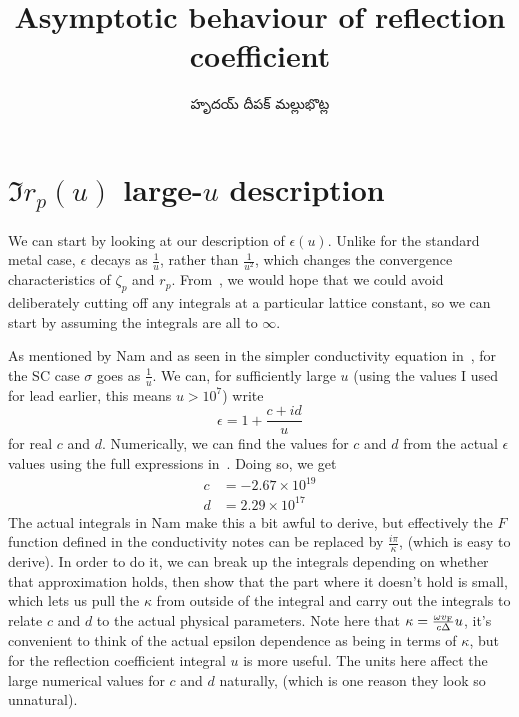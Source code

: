 \documentclass[../main.tex]{subfiles}
\title{Asymptotic behaviour of reflection coefficient}
\author{\begin{telugu}హృదయ్ దీపక్ మల్లుభొట్ల\end{telugu}}
\date{}
\begin{document}
	\graphicspath{{\main/figures/}}

	\onlyinsubfile{\maketitle}

	\section{\texorpdfstring{$\Im r_p(u)$}{imrp} large-\texorpdfstring{$u$}{u} description} \label{sec:imrpasymptotic}

	We can start by looking at our description of $\epsilon(u)$.
	Unlike for the standard metal case, $\epsilon$ decays as $\frac{1}{u}$, rather than $\frac{1}{u^2}$, which changes the convergence characteristics of $\zeta_p$ and $r_p$.
	From~\cite{Churchill2016}, we would hope that we could avoid deliberately cutting off any integrals at a particular lattice constant, so we can start by assuming the integrals are all to $\infty$.

	As mentioned by Nam\cite{Nam1967} and as seen in the simpler conductivity equation in~\cite{AGD}, for the SC case $\sigma$ goes as $\frac1u$.
	We can, for sufficiently large $u$ (using the values I used for lead earlier, this means $u > 10^7$) write
	\begin{equation}
		\epsilon = 1 + \frac{c + i d}{u} \label{eq:epsansatz}
	\end{equation}
	for real $c$ and $d$.
	Numerically, we can find the values for $c$ and $d$ from the actual $\epsilon$ values using the full expressions in~\cite{Nam1967}.
	Doing so, we get
	\begin{align}
		c &= -2.67 \times 10^{19} \\
		d &= 2.29 \times 10^{17}
	\end{align}
	The actual integrals in Nam make this a bit awful to derive, but effectively the $F$ function defined in the conductivity notes can be replaced by $\frac{i \pi}{\kappa}$, (which is easy to derive).
	In order to do it, we can break up the integrals depending on whether that approximation holds, then show that the part where it doesn't hold is small, which lets us pull the $\kappa$ from outside of the integral and carry out the integrals to relate $c$ and $d$ to the actual physical parameters.
	Note here that $\kappa = \frac{\omega v_{\mathrm{F}}}{c \Delta} u$, it's convenient to think of the actual epsilon dependence as being in terms of $\kappa$, but for the reflection coefficient integral $u$ is more useful.
	The units here affect the large numerical values for $c$ and $d$ naturally, (which is one reason they look so unnatural).
\end{document}
